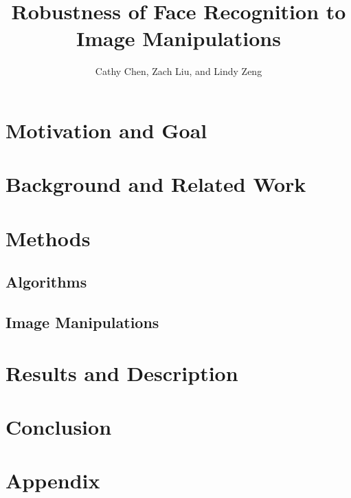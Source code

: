 \documentclass[pageno]{cos429}
\begin{document}
\title{Robustness of Face Recognition to Image Manipulations}

\author{Cathy Chen, Zach Liu, and Lindy Zeng}
\date{}
\maketitle

\section{Motivation and Goal}
\section{Background and Related Work}
\section{Methods}
\subsection{Algorithms}
\subsection{Image Manipulations}
\section{Results and Description}
\section{Conclusion}



 
\section{Appendix}
\end{document}
